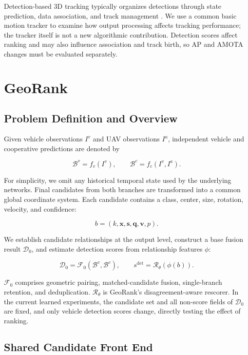 Detection-based 3D tracking typically organizes detections through state prediction, data association, and track management \cite{ref13}. We use a common basic motion tracker to examine how output processing affects tracking performance; the tracker itself is not a new algorithmic contribution. Detection scores affect ranking and may also influence association and track birth, so AP and AMOTA changes must be evaluated separately.

\section{GeoRank}

\subsection{Problem Definition and Overview}

Given vehicle observations $I^v$ and UAV observations $I^a$, independent vehicle and cooperative predictions are denoted by

\[
\mathcal B^v=f_v(I^v),\qquad \mathcal B^c=f_c(I^v,I^a).
\]

For simplicity, we omit any historical temporal state used by the underlying networks. Final candidates from both branches are transformed into a common global coordinate system. Each candidate contains a class, center, size, rotation, velocity, and confidence:

\[
b=(k,\mathbf x,\mathbf s,\mathbf q,\mathbf v,p).
\]

We establish candidate relationships at the output level, construct a base fusion result $\mathcal D_0$, and estimate detection scores from relationship features $\phi$:

\[
\mathcal D_0=\mathcal F_0(\mathcal B^v,\mathcal B^c),\qquad s^{\mathrm{det}}=\mathcal R_\theta(\phi(b)).
\]

$\mathcal F_0$ comprises geometric pairing, matched-candidate fusion, single-branch retention, and deduplication. $\mathcal R_\theta$ is GeoRank's disagreement-aware rescorer. In the current learned experiments, the candidate set and all non-score fields of $\mathcal D_0$ are fixed, and only vehicle detection scores change, directly testing the effect of ranking.

\subsection{Shared Candidate Front End}

